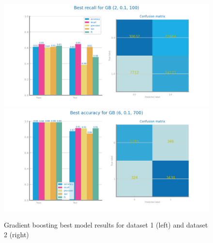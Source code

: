 \documentclass[10pt]{extarticle}
\begin{document}
\begin{figure}[H]
\centering\includegraphics[scale=0.95]{images/dataset1/models_evaluation/CovidPos_gb_GB_best_recall_eval.png}
\includegraphics[scale=0.95]{images/dataset2/models_evaluation/Credit_Score_gb_best_model_performance_accuracy.png}
\caption{Gradient boosting best model results for dataset 1 (left) and dataset 2 (right)}
\end{figure}
\end{document}

